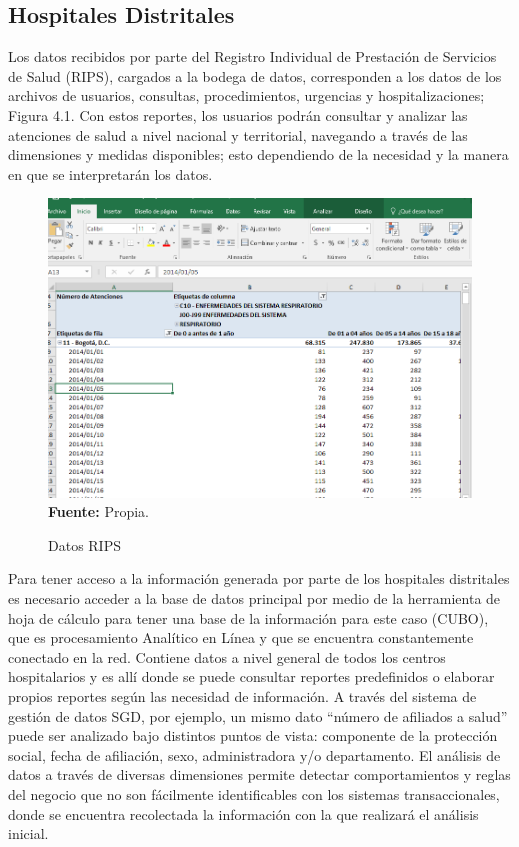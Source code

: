 \documentclass[a4paper,openright,12pt]{book}
\theoremstyle{definition}
\theoremstyle{remark}
\begin{document}
\subsection{Hospitales Distritales}
Los datos recibidos por parte del Registro Individual de Prestación de Servicios de Salud (RIPS), cargados a la bodega de datos, corresponden a los datos de los archivos de usuarios, consultas, procedimientos, urgencias y hospitalizaciones; Figura 4.1. Con estos reportes, los usuarios podrán consultar y analizar las atenciones de salud a nivel nacional y territorial, navegando a través de las dimensiones y medidas disponibles; esto dependiendo de la necesidad y la manera en que se interpretarán los datos.

\begin{figure}[ht]
\centering
\caption{Datos RIPS} 
\includegraphics[scale=0.6]{prepa2}
\label{fig:Rips6}
\\ \textbf{Fuente:} Propia.
\end{figure}

Para tener acceso a la información generada por parte de los hospitales distritales es necesario acceder  a la base de datos principal por medio de la herramienta de  hoja de cálculo para tener una base de la información para este caso (CUBO), que es procesamiento Analítico en Línea y que se encuentra constantemente conectado en la red. Contiene datos a nivel general de todos los centros hospitalarios y es allí donde se puede consultar reportes predefinidos o elaborar propios reportes según las necesidad de información. A través del sistema de gestión de datos SGD, por ejemplo, un mismo dato “número de afiliados a salud” puede ser analizado bajo distintos puntos de vista: componente de la protección social, fecha de afiliación, sexo, administradora y/o departamento. El análisis de datos a través de diversas dimensiones permite detectar comportamientos y reglas del negocio que no son fácilmente identificables con los sistemas transaccionales,
donde se encuentra recolectada la información con la que realizará el análisis inicial.
\end{document}
